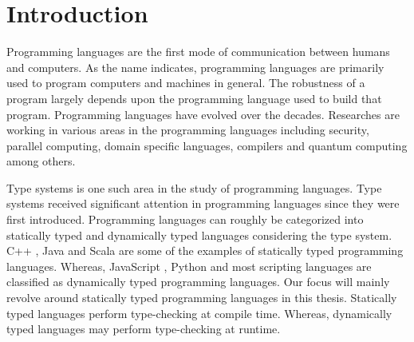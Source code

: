 
\chapter{Introduction}
\label{chap:intro}

Programming languages are the first mode of communication between
humans and computers. As the name indicates, programming 
languages are primarily used to program computers and 
machines in general. The robustness of a program largely depends
upon the programming language used to build that program.
Programming languages have evolved over the decades. Researches are
working in various areas in the programming languages including 
security, parallel computing, domain specific languages,
compilers and quantum computing among others. 

Type systems \citep{cardelli1996type,pierce2002types} is one such area
in the study of programming languages.
Type systems received significant attention in programming languages
since they were first introduced.
Programming languages can 
roughly be categorized into statically typed and
dynamically typed languages considering the type system.
C++ \citep{stroustrup1986overview}, Java \citep{gosling2000java}
and Scala \citep{odersky2004overview} are some of the examples of
statically typed programming languages.
Whereas, JavaScript \citep{crockford2008javascript},
Python \citep{van1995python} and most scripting
languages are classified as dynamically typed programming
languages. Our focus will mainly revolve around
statically typed programming languages in this thesis.
Statically typed languages perform 
type-checking at compile time. Whereas, dynamically typed 
languages may perform type-checking at runtime.

